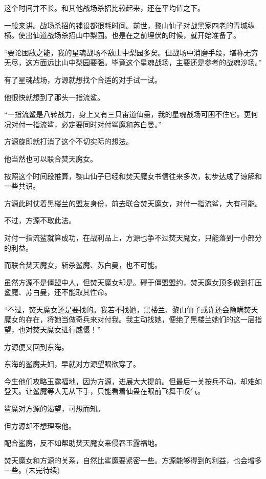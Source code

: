 \begin{this_body}
这个时间并不长。和其他战场杀招比较起来，还在平均值之下。

一般来讲。战场杀招的铺设都很耗时间。前世，黎山仙子对战黑家四老的青城纵横。使出仙道战场杀招山中梨园。也是在之前埋伏的时候，就开始准备了。

“要论困敌之能，我的星魂战场不敌山中梨园多矣。但战场中消磨手段，堪称无穷无尽，这方面远比山中梨园要强。毕竟这个星魂战场，主要还是参考的战魂沙场。”

有了星魂战场，方源就想找个合适的对手试一试。

他很快就想到了那头一指流鲨。

“一指流鲨是八转战力，身上又有三只宙道仙蛊，我的星魂战场可困不住它。更何况对付一指流鲨，必定要同时对付鲨魔和苏白曼。”

方源旋即就打消了这个不切实际的想法。

他当然也可以联合焚天魔女。

按照这个时间段推算，黎山仙子已经和焚天魔女书信往来多次，初步达成了谅解和一些共识。

方源此时仗着黑楼兰的盟友身份，前去联合焚天魔女，对付一指流鲨，大有可能。

不过，方源不取此法。

对付一指流鲨就算成功，在战利品上，方源也争不过焚天魔女，只能落到一小部分的利益。

而联合焚天魔女，斩杀鲨魔、苏白曼，也不可能。

虽然方源不是僵盟中人，但焚天魔女却是。碍于僵盟盟约，焚天魔女顶多做到打压鲨魔、苏白曼，还不能取其性命。

“不过，焚天魔女还是要找的。我若不找她，黑楼兰、黎山仙子或许还会隐瞒焚天魔女的存在，将她当做奇兵来对付我。我主动找她，便绝了黑楼兰她们的这一层指望，也对焚天魔女进行威慑！”

方源便又回到东海。

东海的鲨魔夫妇，早就对方源望眼欲穿了。

今生他们攻略玉露福地，因为方源，进展大大提前。但最后一关按兵不动，却难如登天。让鲨魔等人无从下手，只能看着仙蛊在眼前飞舞干叹气。

鲨魔对方源的渴望，可想而知。

但方源却不想理睬他。

配合鲨魔，反不如帮助焚天魔女来侵吞玉露福地。

焚天魔女和方源的关系，自然比鲨魔要紧密一些。方源能够得到的利益，也会增多一些。(未完待续)

\end{this_body}

